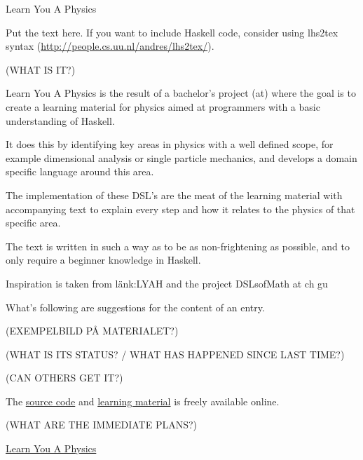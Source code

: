 \documentclass[DIV16,twocolumn,10pt]{scrreprt}
\begin{document}
\begin{hcarentry}{Learn You A Physics}
\makeheader

Put the text here. 
If you want to include Haskell code, consider using lhs2tex syntax (\url{http://people.cs.uu.nl/andres/lhs2tex/}).

(WHAT IS IT?)

Learn You A Physics is the result of a bachelor's project (at) where the
goal is to create a learning material for physics aimed at programmers
with a basic understanding of Haskell. 

It does this by identifying key areas in physics with a well defined scope,
for example dimensional analysis or single particle mechanics, and develops
a domain specific language around this area.

The implementation of these DSL's are the meat of the learning material with
accompanying text to explain every step and how it relates to the physics of
that specific area. 

The text is written in such a way as to be as non-frightening as possible, 
and to only require a beginner knowledge in Haskell.

Inspiration is taken from länk:LYAH and the project DSLsofMath at ch gu

What's following are suggestions for the content of an entry.

(EXEMPELBILD PÅ MATERIALET?)

(WHAT IS ITS STATUS? / WHAT HAS HAPPENED SINCE LAST TIME?)

(CAN OTHERS GET IT?)

The \href{https://github.com/DSLsofMath/BScProj2018/tree/master/Physics}{source
code} and \href{https://dslsofmath.github.io/BScProj2018/}{learning material}
is freely available online.

(WHAT ARE THE IMMEDIATE PLANS?)

\FurtherReading
  \href{https://dslsofmath.github.io/BScProj2018/} {Learn You A Physics}
\end{hcarentry}
\end{document}
